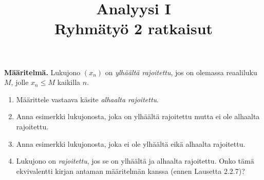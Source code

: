 \documentclass[11pt,a4paper]{amsart}
\title{Analyysi I\\Ryhmätyö 2 ratkaisut}
\author{}
\date{}
\begin{document}

\begin{exercise}
  \textbf{Määritelmä.} Lukujono $(x_n)$ on \emph{ylhäältä rajoitettu}, jos on
  olemassa reaaliluku $M$, jolle $x_n \leq M$ kaikilla $n$.
\begin{enumerate}[label=\alph*), nosep]
  \item Määrittele vastaava käsite \emph{alhaalta rajoitettu}.
  \item Anna esimerkki lukujonosta, joka on ylhäältä rajoitettu mutta ei ole
    alhaalta rajoitettu.
  \item Anna esimerkki lukujonosta, joka ei ole ylhäältä eikä alhaalta
    rajoitettu.
  \item Lukujono on \emph{rajoitettu}, jos se on ylhäältä ja alhaalta
    rajoitettu. Onko tämä ekvivalentti kirjan antaman määritelmän kanssa
    (ennen Lausetta 2.2.7)?
\end{enumerate}
\end{exercise}
\end{document}
